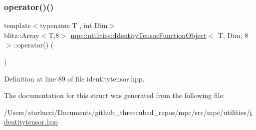 \subsubsection{\texorpdfstring{operator()()}{operator()()}}
{\footnotesize\ttfamily template$<$typename T , int Dim$>$ \\
blitz\+::\+Array$<$T,8$>$ \mbox{\hyperlink{structmpc_1_1utilities_1_1_identity_tensor_function_object}{mpc\+::utilities\+::\+Identity\+Tensor\+Function\+Object}}$<$ T, Dim, 8 $>$\+::operator() (\begin{DoxyParamCaption}{ }\end{DoxyParamCaption})\hspace{0.3cm}{\ttfamily [inline]}}



Definition at line 89 of file identitytensor.\+hpp.



The documentation for this struct was generated from the following file\+:\begin{DoxyCompactItemize}
\item 
/\+Users/atorlucci/\+Documents/github\+\_\+threecubed\+\_\+repos/mpc/src/mpc/utilities/\mbox{\hyperlink{identitytensor_8hpp}{identitytensor.\+hpp}}\end{DoxyCompactItemize}
